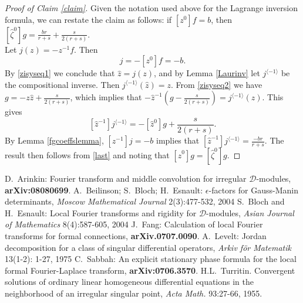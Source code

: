 \documentclass[11pt]{amsart}
\theoremstyle{theorem}
\theoremstyle{lemma}
\theoremstyle{corollary}
\theoremstyle{proposition}
\theoremstyle{definition}
\theoremstyle{remark}
\def\z{\hat{\zeta}}
\begin{document}
\begin{proof}[Proof of Claim \ref{claim}]
    Given the notation used above for the Lagrange inversion formula, we can restate the claim as follows: if $[z^0]f=b$, then $[\z^0]g=\frac{br}{r+s}+\frac{s}{2(r+s)}$.\\
      Let $j(z)=-z^{-1}f$.  Then
    \begin{equation*}
    [z^{-1}]j=-[z^0]f=-b.
    \end{equation*}
      By \eqref{zisyseq1} we conclude that $\hat{z}=j(z)$, and by Lemma \ref{Laurinv} let $j^{\langle -1 \rangle}$ be the compositional inverse.  Then $j^{\langle -1 \rangle}(\hat{z})=z$.  From \eqref{zisyseq2} we have $g=-z\hat{z}+\frac{s}{2(r+s)}$, which implies that $-\hat{z}^{-1}(g-\frac{s}{2(r+s)})=j^{\langle -1 \rangle}(\hat{z})$.  This gives
      \begin{equation}\label{last}
    [\hat{z}^{-1}]j^{\langle -1 \rangle}=-[\hat{z}^0]g+\frac{s}{2(r+s)}.
    \end{equation}
    By Lemma \ref{fgcoeffslemma}, $[z^{-1}]j=-b$ implies that $[\hat{z}^{-1}]j^{\langle -1 \rangle}=\frac{-br}{r+s}$.  The result then follows from \eqref{last} and noting that $[\hat{z}^0]g=[\z^0]g$.
\end{proof}


\begin{thebibliography}{99}
 D.~Arinkin: Fourier transform and middle convolution for irregular $\mathcal{D}$-modules, \textbf{arXiv:08080699}.
 A.~Beilinson; S.~Bloch; H.~Esnault: $\epsilon$-factors for Gauss-Manin determinants, \textit{Moscow Mathematical Journal} 2(3):477-532, 2004
 S.~Bloch and H.~Esnault: Local Fourier transforms and rigidity for  $\mathcal{D}$-modules, \textit{Asian Journal of Mathematics} 8(4):587-605, 2004
 J.~Fang: Calculation of local Fourier transforms for formal connections, \textbf{arXiv.0707.0090}.
 A.~Levelt: Jordan decomposition for a class of singular differential operators, \textit{Arkiv f\"{o}r Matematik} 13(1-2): 1-27, 1975
 C.~Sabbah: An explicit stationary phase formula for the local formal Fourier-Laplace transform, \textbf{arXiv:0706.3570}.
H.L.~Turritin. Convergent solutions of ordinary linear homogeneous differential equations in the neighborhood of an irregular singular point, \emph{Acta Math.} 93:27-66, 1955.
\end{thebibliography}
\end{document}
